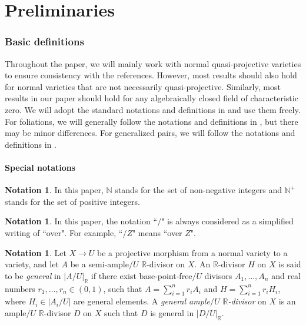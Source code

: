 \documentclass[11pt]{amsart}
\numberwithin{equation}{section}
\newcommand{\Rr}{\mathbb{R}}
\theoremstyle{definition}
\theoremstyle{definition}
\newtheorem{nota}[thm]{Notation}
\theoremstyle{definition}
\begin{document}
\part{Preliminaries}\label{part:prelim}

\section{Basic definitions}\label{sec: preliminaries}

 Throughout the paper, we will mainly work with normal quasi-projective varieties to ensure consistency with the references. However, most results should also hold for normal varieties that are not necessarily quasi-projective. Similarly, most results in our paper should hold for any algebraically closed field of characteristic zero. We will adopt the standard notations and definitions in \cite{KM98, BCHM10} and use them freely. For foliations, we will generally follow the notations and definitions in \cite{CS20,ACSS21,CS21}, but there may be minor differences. For generalized pairs, we will follow the notations and definitions in \cite{HL21a}.

\subsection{Special notations}

\begin{nota}
    In this paper, $\mathbb N$ stands for the set of non-negative integers and $\mathbb N^+$ stands for the set of positive integers. 
\end{nota}

\begin{nota}
In this paper, the notation ``$/$" is always considered as a simplified writing of ``over". For example, ``$/Z$" means ``over $Z$".
\end{nota}

\begin{nota}\label{nota: general r divisor}
    Let $X\rightarrow U$ be a projective morphism from a normal variety to a variety, and let $A$ be a semi-ample$/U$ $\Rr$-divisor on $X$. An $\Rr$-divisor $H$ on $X$ is said to be \emph{general} in $|A/U|_{\mathbb R}$ if there exist base-point-free$/U$ divisors $A_1,\dots,A_n$ and real numbers $r_1,\dots,r_n\in (0,1)$, such that $A=\sum_{i=1}^nr_iA_i$ and $H=\sum_{i=1}^nr_iH_i$, where $H_i\in |A_i/U|$ are general elements. A \emph{general ample$/U$ $\Rr$-divisor} on $X$ is an ample$/U$ $\Rr$-divisor $D$ on $X$ such that $D$ is general in $|D/U|_{\mathbb R}$.
\end{nota}
\end{document}
